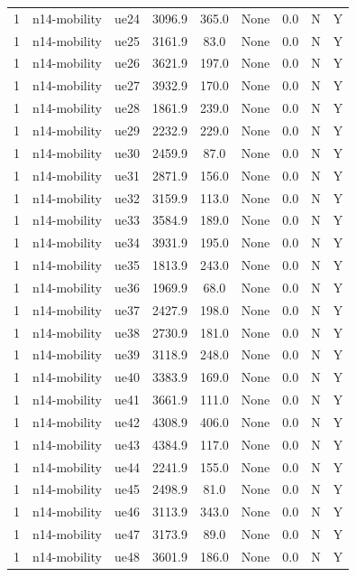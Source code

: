 \begin{table}[ht]
\begin{tabular}{|c|c|c|c|c|c|c|c|c|}
1 & n14-mobility & ue24 & 3096.9 & 365.0 & None & 0.0 & N & Y \\
1 & n14-mobility & ue25 & 3161.9 & 83.0 & None & 0.0 & N & Y \\
1 & n14-mobility & ue26 & 3621.9 & 197.0 & None & 0.0 & N & Y \\
1 & n14-mobility & ue27 & 3932.9 & 170.0 & None & 0.0 & N & Y \\
1 & n14-mobility & ue28 & 1861.9 & 239.0 & None & 0.0 & N & Y \\
1 & n14-mobility & ue29 & 2232.9 & 229.0 & None & 0.0 & N & Y \\
1 & n14-mobility & ue30 & 2459.9 & 87.0 & None & 0.0 & N & Y \\
1 & n14-mobility & ue31 & 2871.9 & 156.0 & None & 0.0 & N & Y \\
1 & n14-mobility & ue32 & 3159.9 & 113.0 & None & 0.0 & N & Y \\
1 & n14-mobility & ue33 & 3584.9 & 189.0 & None & 0.0 & N & Y \\
1 & n14-mobility & ue34 & 3931.9 & 195.0 & None & 0.0 & N & Y \\
1 & n14-mobility & ue35 & 1813.9 & 243.0 & None & 0.0 & N & Y \\
1 & n14-mobility & ue36 & 1969.9 & 68.0 & None & 0.0 & N & Y \\
1 & n14-mobility & ue37 & 2427.9 & 198.0 & None & 0.0 & N & Y \\
1 & n14-mobility & ue38 & 2730.9 & 181.0 & None & 0.0 & N & Y \\
1 & n14-mobility & ue39 & 3118.9 & 248.0 & None & 0.0 & N & Y \\
1 & n14-mobility & ue40 & 3383.9 & 169.0 & None & 0.0 & N & Y \\
1 & n14-mobility & ue41 & 3661.9 & 111.0 & None & 0.0 & N & Y \\
1 & n14-mobility & ue42 & 4308.9 & 406.0 & None & 0.0 & N & Y \\
1 & n14-mobility & ue43 & 4384.9 & 117.0 & None & 0.0 & N & Y \\
1 & n14-mobility & ue44 & 2241.9 & 155.0 & None & 0.0 & N & Y \\
1 & n14-mobility & ue45 & 2498.9 & 81.0 & None & 0.0 & N & Y \\
1 & n14-mobility & ue46 & 3113.9 & 343.0 & None & 0.0 & N & Y \\
1 & n14-mobility & ue47 & 3173.9 & 89.0 & None & 0.0 & N & Y \\
1 & n14-mobility & ue48 & 3601.9 & 186.0 & None & 0.0 & N & Y \\

\end{tabular}
\end{table}
